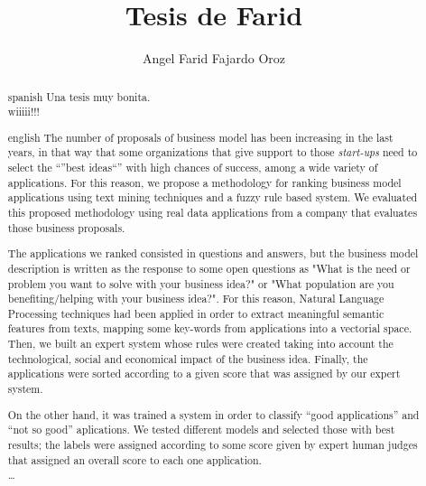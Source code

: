 \documentclass{tesisITAM}
\title{Tesis de Farid}
\author{Angel Farid Fajardo Oroz}
\begin{document}
	\npthousandsep{,}
	\maketitle
	\publicationrights
	

	
	


	\begin{abstract}{spanish}
		Una tesis muy bonita.\\
		wiiiii!!!
	\end{abstract}

	\begin{abstract}{english}
The number of proposals of business model has been increasing in the last years, in that way that some organizations that give support to those \textit{start-ups} need to select the ``''best ideas``'' with high chances of success, among a wide variety of applications. For this reason, we propose a methodology for ranking business model applications using text mining techniques and a fuzzy rule based system. We evaluated this proposed methodology using real data applications from a company that evaluates those business proposals.

The applications we ranked consisted in questions and answers, but the business model description is written as the response to some open questions as "What is the need or problem you want to solve with your business idea?" or "What population are you benefiting/helping with your business idea?". For this reason, Natural Language Processing techniques had been applied in order to extract meaningful semantic features from texts, mapping some key-words from applications into a vectorial space. Then, we built an expert system whose rules were created taking into account the technological, social and economical impact of the business idea. Finally, the applications were sorted according to a given score that was assigned by our expert system.

On the other hand, it was trained a system in order to classify ``good applications'' and ``not so good'' aplications. We tested different models and selected those with best results; the labels were assigned according to some score given by expert human judges that assigned an overall score to each one application.\\
\dots

	\end{abstract}
\end{document}
